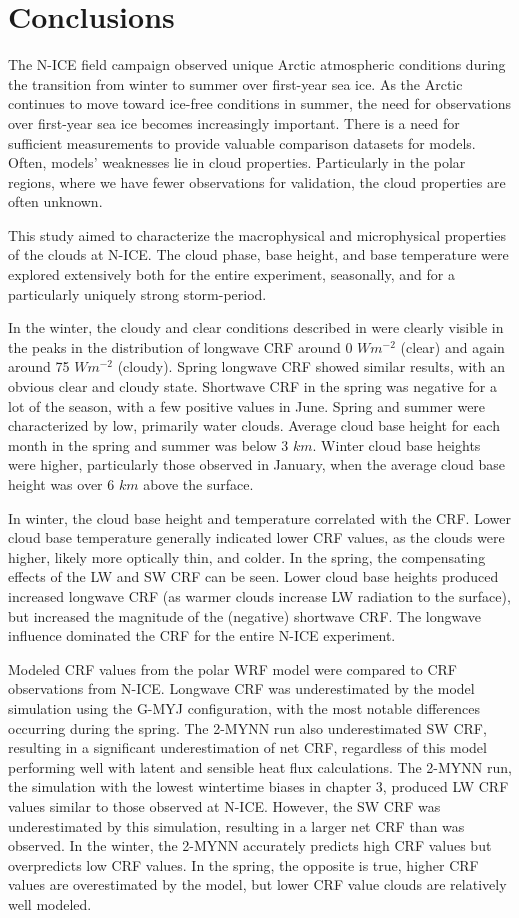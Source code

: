 \section{Conclusions}
The N-ICE field campaign observed unique Arctic atmospheric conditions during the transition from winter to summer over first-year sea ice. As the Arctic continues to move toward ice-free conditions in summer, the need for observations over first-year sea ice becomes increasingly important. There is a need for sufficient measurements to provide valuable comparison datasets for models. Often, models' weaknesses lie in cloud properties. Particularly in the polar regions, where we have fewer observations for validation, the cloud properties are often unknown.

This study aimed to characterize the macrophysical and microphysical properties of the clouds at N-ICE. The cloud phase, base height, and base temperature were explored extensively both for the entire experiment, seasonally, and for a particularly uniquely strong storm-period. 

In the winter, the cloudy and clear conditions described in \citet{graham:2017:events} were clearly visible in the peaks in the distribution of longwave CRF around 0 $Wm^{-2}$ (clear) and again around 75 $Wm^{-2}$ (cloudy). Spring longwave CRF showed similar results, with an obvious clear and cloudy state. Shortwave CRF in the spring was negative for a lot of the season, with a few positive values in June. Spring and summer were characterized by low, primarily water clouds. Average cloud base height for each month in the spring and summer was below 3 $km$. Winter cloud base heights were higher, particularly those observed in January, when the average cloud base height was over 6 $km$ above the surface.

In winter, the cloud base height and temperature correlated with the CRF. Lower cloud base temperature generally indicated lower CRF values, as the clouds were higher, likely more optically thin, and colder. In the spring, the compensating effects of the LW and SW CRF can be seen. Lower cloud base heights produced increased longwave CRF (as warmer clouds increase LW radiation to the surface), but increased the magnitude of the (negative) shortwave CRF. The longwave influence dominated the CRF for the entire N-ICE experiment. 

Modeled CRF values from the polar WRF model were compared to CRF observations from N-ICE. Longwave CRF was underestimated by the model simulation using the G-MYJ configuration, with the most notable differences occurring during the spring. The 2-MYNN run also underestimated SW CRF, resulting in a significant underestimation of net CRF, regardless of this model performing well with latent and sensible heat flux calculations. The 2-MYNN run, the simulation with the lowest wintertime biases in chapter 3, produced LW CRF values similar to those observed at N-ICE. However, the SW CRF was underestimated by this simulation, resulting in a larger net CRF than was observed. In the winter, the 2-MYNN accurately predicts high CRF values but overpredicts low CRF values. In the spring, the opposite is true, higher CRF values are overestimated by the model, but lower CRF value clouds are relatively well modeled.

